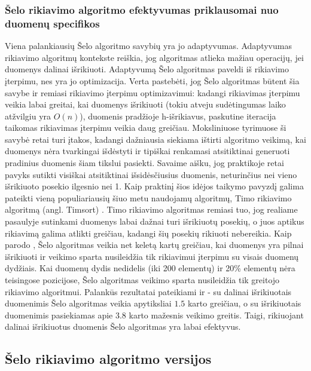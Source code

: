 \documentclass{VUMIFInfKursinis}
\begin{document}
\subsubsection{Šelo rikiavimo algoritmo efektyvumas priklausomai nuo duomenų specifikos}

Viena palankiausių Šelo algoritmo savybių yra jo adaptyvumas.
Adaptyvumas rikiavimo algoritmų kontekste reiškia, jog algoritmas atlieka mažiau operacijų, jei duomenys dalinai išrikiuoti.
Adaptyvumą Šelo algoritmas paveldi iš rikiavimo įterpimu, nes yra jo optimizacija.
Verta pastebėti, jog Šelo algoritmas būtent šia savybe ir remiasi rikiavimo įterpimu optimizavimui:
kadangi rikiavimas įterpimu veikia labai greitai, kai duomenys išrikiuoti (tokiu atveju sudėtingumas laiko atžvilgiu yra $O(n)$),
duomenis pradžioje h-išrikiavus, paskutine iteracija taikomas rikiavimas įterpimu veikia daug greičiau.
Moksliniuose tyrimuose ši savybė retai turi įtakos, kadangi dažniausia siekiama ištirti algoritmo veikimą, kai duomenys
nėra tvarkingai išdėstyti ir tipiškai renkamasi atsitiktinai generuoti pradinius duomenis šiam tikslui pasiekti.
Savaime aišku, jog praktikoje retai pavyks sutikti visiškai atsitiktinai išsidėsčiusius duomenis, neturinčius nei vieno išrikiuoto posekio ilgesnio nei 1.
Kaip praktinį šios idėjos taikymo pavyzdį galima pateikti vieną populiariausių šiuo metu naudojamų algoritmų, Timo rikiavimo algoritmą (angl. Timsort) \cite{auger2018worst}. 
Timo rikiavimo algoritmas remiasi tuo, jog realiame pasaulyje sutinkami duomenys labai dažnai turi išrikiuotų posekių,
o juos aptikus rikiavimą galima atlikti greičiau, kadangi šių posekių rikiuoti nebereikia.
Kaip parodo \cite{10.1145/359024.359026}, Šelo algoritmas veikia net keletą kartų greičiau, kai duomenys yra pilnai
išrikiuoti ir veikimo sparta nusileidžia tik rikiavimui įterpimu su visais duomenų dydžiais.
Kai duomenų dydis nedidelis (iki 200 elementų) ir 20\% elementų nėra teisingose pozicijose, Šelo algoritmas veikimo sparta nusileidžia tik greitojo rikiavimo algoritmui.
Palankūs rezultatai pateikiami ir \cite{7280062} - su dalinai išrikiuotais duomenimis Šelo algoritmas veikia apytiksliai $1.5$ karto greičiau, o su išrikiuotais
duomenimis pasiekiamas apie $3.8$ karto mažesnis veikimo greitis.
Taigi, rikiuojant dalinai išrikiuotus duomenis Šelo algoritmas yra labai efektyvus.

\subsection{Šelo rikiavimo algoritmo versijos}
\end{document}
